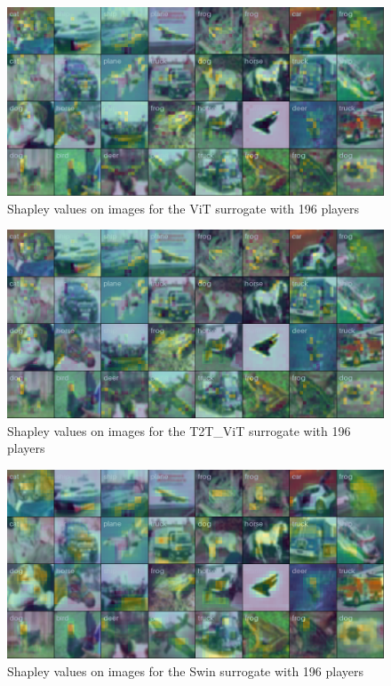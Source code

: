 \documentclass[magisterska,en]{pracamgr}
\begin{document}
\pagebreak

\begin{figure}[H]
\centering
\includegraphics[scale=0.4]{./images/vit_shap_grid_196.png}
\caption{Shapley values on images for the ViT surrogate with 196 players}
\label{vit_shap_grid_196}
\end{figure}


\begin{figure}[H]
\centering
\includegraphics[scale=0.4]{./images/t2t_vit_shap_grid_196.png}
\caption{Shapley values on images for the T2T\_ViT surrogate with 196 players}
\label{t2t_vit_shap_grid_196}
\end{figure}


\begin{figure}[H]
\centering
\includegraphics[scale=0.4]{./images/swin_shap_grid_196.png}
\caption{Shapley values on images for the Swin surrogate with 196 players}
\label{swin_shap_grid_196}
\end{figure}
\end{document}
